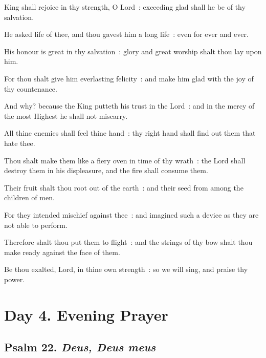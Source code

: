  King shall rejoice in thy strength, O Lord~: exceeding glad shall he be of thy salvation.\par
{}
He asked life of thee, and thou gavest him a long life~: even for ever and ever.\par
{}His honour is great in thy salvation~: glory and great worship shalt thou lay upon him.\par
{}For thou shalt give him everlasting felicity~: and make him glad with the joy of thy countenance.\par
{}And why? because the King putteth his trust in the Lord~: and in the mercy of the most Highest he shall not miscarry.\par
{}All thine enemies shall feel thine hand~: thy right hand shall find out them that hate thee.\par
{}Thou shalt make them like a fiery oven in time of thy wrath~: the Lord shall destroy them in his displeasure, and the fire shall consume them.\par
{}Their fruit shalt thou root out of the earth~: and their seed from among the children of men.\par
{}For they intended mischief against thee~: and imagined such a device as they are not able to perform.\par
{}Therefore shalt thou put them to flight~: and the strings of thy bow shalt thou make ready against the face of them.\par
{}Be thou exalted, Lord, in thine own strength~: so we will sing, and praise thy power.\par

\section*{Day 4. Evening Prayer}

\subsection{Psalm 22. \textit{Deus, Deus meus}}

